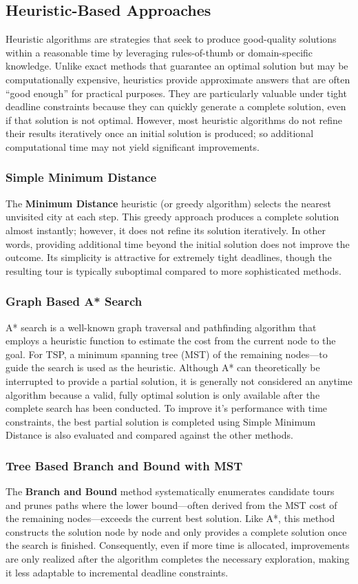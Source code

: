 \documentclass[11pt]{article}
\begin{document}
	\subsection{Heuristic-Based Approaches}
	Heuristic algorithms are strategies that seek to produce good-quality solutions within a reasonable time by leveraging rules-of-thumb or domain-specific knowledge. Unlike exact methods that guarantee an optimal solution but may be computationally expensive, heuristics provide approximate answers that are often “good enough” for practical purposes. They are particularly valuable under tight deadline constraints because they can quickly generate a complete solution, even if that solution is not optimal. However, most heuristic algorithms do not refine their results iteratively once an initial solution is produced; so additional computational time may not yield significant improvements.
	
	\subsubsection{Simple Minimum Distance}
	The \textbf{Minimum Distance} heuristic (or greedy algorithm) selects the nearest unvisited city at each step. This greedy approach produces a complete solution almost instantly; however, it does not refine its solution iteratively. In other words, providing additional time beyond the initial solution does not improve the outcome. Its simplicity is attractive for extremely tight deadlines, though the resulting tour is typically suboptimal compared to more sophisticated methods.
	
	\subsubsection{Graph Based A* Search}
	A* search is a well-known graph traversal and pathfinding algorithm that employs a heuristic function to estimate the cost from the current node to the goal. For TSP, a minimum spanning tree (MST) of the remaining nodes—to guide the search is used as the heuristic. Although A* can theoretically be interrupted to provide a partial solution, it is generally not considered an anytime algorithm because a valid, fully optimal solution is only available after the complete search has been conducted. To improve it's performance with time constraints, the best partial solution is completed using Simple Minimum Distance is also evaluated and compared against the other methods.
	
	\subsubsection{Tree Based Branch and Bound with MST}
	The \textbf{Branch and Bound} method systematically enumerates candidate tours and prunes paths where the lower bound—often derived from the MST cost of the remaining nodes—exceeds the current best solution. Like A*, this method constructs the solution node by node and only provides a complete solution once the search is finished. Consequently, even if more time is allocated, improvements are only realized after the algorithm completes the necessary exploration, making it less adaptable to incremental deadline constraints.
\end{document}
